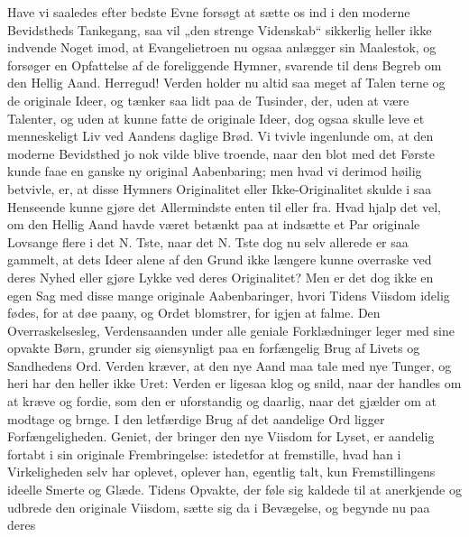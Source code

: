 \documentclass[12pt,a4paper]{book}
\begin{document}
Have vi saaledes efter bedste Evne forsøgt at sætte os ind i den moderne
Bevidstheds Tankegang, saa vil „den strenge Videnskab“ sikkerlig heller ikke
indvende Noget imod, at Evangelietroen nu ogsaa anlægger sin Maalestok, og
forsøger en Opfattelse af de foreliggende Hymner, svarende til dens Begreb om den
Hellig Aand. Herregud! Verden holder nu altid saa meget af Talen\-%
terne og de originale Ideer, og tænker saa lidt paa de Tusinder, der, uden at være
Talenter, og uden at kunne fatte de originale Ideer, dog ogsaa skulle leve et
menneskeligt Liv ved Aandens daglige Brød. Vi tvivle ingenlunde om, at den moderne
Bevidsthed jo nok vilde blive troende, naar den blot med det Første kunde faae en
ganske ny original Aabenbaring; men hvad vi derimod høilig betvivle, er, at disse
Hymners Originalitet eller Ikke-Originalitet skulde i saa Henseende kunne gjøre
det Allermindste enten til eller fra. Hvad hjalp det vel, om den Hellig Aand havde
været betænkt paa at indsætte et Par originale Lovsange flere i det N. Tste, naar
det N. Tste dog nu selv allerede er saa gammelt, at dets Ideer alene af den Grund
ikke længere kunne overraske ved deres Nyhed eller gjøre Lykke ved deres
Originalitet? Men er det dog ikke en egen Sag med disse mange originale
Aabenbaringer, hvori Tidens Viisdom idelig fødes, for at døe paany, og Ordet
blomstrer, for igjen at falme. Den Overraskelsesleg, Verdensaanden under alle
geniale Forklædninger leger med sine opvakte Børn, grunder sig øiensynligt paa en
forfængelig Brug af Livets og Sandhedens Ord. Verden kræver, at den nye Aand maa
tale med nye Tunger, og heri har den heller ikke Uret: Verden er ligesaa klog og
snild, naar der handles om at kræve og fordie, som den er uforstandig og daarlig,
naar det gjælder om at modtage og brnge. I den letfærdige Brug af det aandelige
Ord ligger Forfængeligheden. Geniet, der bringer den nye Viisdom for Lyset, er
aandelig fortabt i sin originale Frembringelse: istedetfor at fremstille, hvad han
i Virkeligheden selv har oplevet, oplever han, egentlig talt, kun Fremstillingens
ideelle Smerte og Glæde. Tidens Opvakte, der føle sig kaldede til at anerkjende og
udbrede den originale Viisdom, sætte sig da i Bevægelse, og begynde nu paa deres
\end{document}
